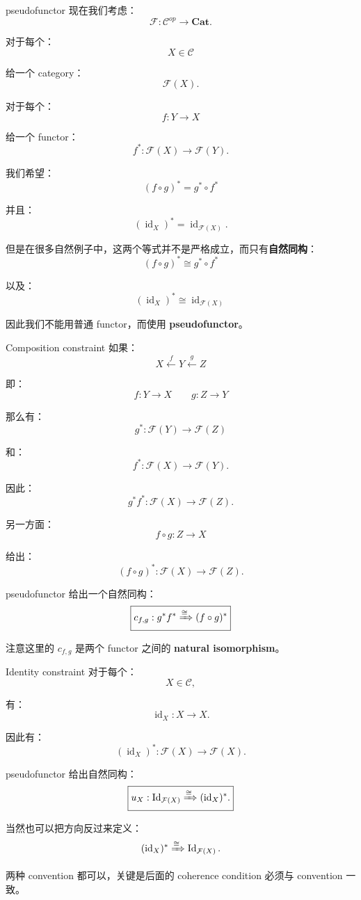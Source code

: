 \documentclass{beamer}
\begin{document}
\begin{frame}{pseudofunctor}
现在我们考虑：
$$
\mathcal F:\mathcal C^{op}\to\mathbf{Cat}.
$$

对于每个：
$$
X\in\mathcal C
$$

给一个 category：
$$
\mathcal F(X).
$$

对于每个：
$$
f:Y\to X
$$

给一个 functor：
$$
f^*:\mathcal F(X)\to\mathcal F(Y).
$$

我们希望：
$$
(f\circ g)^*=g^*\circ f^*
$$

并且：
$$
(\operatorname{id}_X)^*=\operatorname{id}_{\mathcal F(X)}.
$$

但是在很多自然例子中，这两个等式并不是严格成立，而只有\textbf{自然同构}：
$$
\boxed{(f\circ g)^*\cong g^*\circ f^*}
$$

以及：
$$
\boxed{(\operatorname{id}_X)^*\cong\operatorname{id}_{\mathcal F(X)}}
$$

因此我们不能用普通 functor，而使用 \textbf{pseudofunctor}。
\end{frame}

\begin{frame}{Composition constraint}
如果：
$$
X\xleftarrow{f}Y\xleftarrow{g}Z
$$

即：
$$
f:Y\to X
\qquad
g:Z\to Y
$$

那么有：
$$
g^*:\mathcal F(Y)\to\mathcal F(Z)
$$

和：
$$
f^*:\mathcal F(X)\to\mathcal F(Y).
$$

因此：
$$
g^*f^*:\mathcal F(X)\to\mathcal F(Z).
$$

另一方面：
$$
f\circ g:Z\to X
$$

给出：
$$
(f\circ g)^*:\mathcal F(X)\to\mathcal F(Z).
$$

pseudofunctor 给出一个自然同构：
$$
\boxed{
c_{f,g}:
g^*f^*
\xRightarrow{\cong}
(f\circ g)^*
}
$$

注意这里的 $c_{f,g}$ 是两个 functor 之间的 \textbf{natural isomorphism}。
\end{frame}

\begin{frame}[fragile]{Identity constraint}
对于每个：
$$
X\in\mathcal C,
$$

有：
$$
\operatorname{id}_X:X\to X.
$$

因此有：
$$
(\operatorname{id}_X)^*:
\mathcal F(X)\to\mathcal F(X).
$$

pseudofunctor 给出自然同构：
$$
\boxed{
u_X:
\operatorname{Id}_{\mathcal F(X)}
\xRightarrow{\cong}
(\operatorname{id}_X)^*.
}
$$

当然也可以把方向反过来定义：
$$
(\operatorname{id}_X)^*
\xRightarrow{\cong}
\operatorname{Id}_{\mathcal F(X)}.
$$

两种 convention 都可以，关键是后面的 coherence condition 必须与 convention 一致。
\end{frame}
\end{document}
